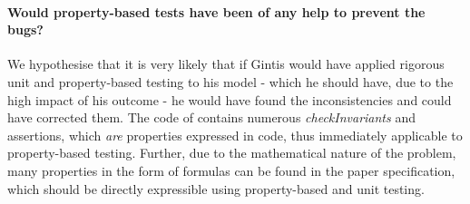 \paragraph{Would property-based tests have been of any help to prevent the bugs?}
We hypothesise that it is very likely that if Gintis would have applied rigorous unit and property-based testing to his model - which he should have, due to the high impact of his outcome - he would have found the inconsistencies and could have corrected them. The code of \cite{evensen_extensible_2010} contains numerous \textit{checkInvariants} and assertions, which \textit{are} properties expressed in code, thus immediately applicable to property-based testing. Further, due to the mathematical nature of the problem, many properties in the form of formulas can be found in the paper specification, which should be directly expressible using property-based and unit testing.